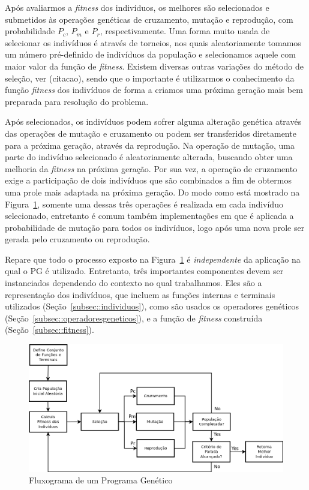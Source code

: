 Após avaliarmos a \textit{fitness} dos indivíduos, os melhores são selecionados e submetidos às operações genéticas de cruzamento, mutação e reprodução, com probabilidade $P_c$, $P_m$ e $P_r$, respectivamente.
Uma forma muito usada de selecionar os indivíduos é através de torneios, nos quais aleatoriamente tomamos um número pré-definido de indivíduos da população e selecionamos aquele com maior valor da função de \textit{fitness}. Existem diversas outras variações do método de seleção, ver (citacao), sendo que o importante é utilizarmos o conhecimento da função \textit{fitness} dos indivíduos de forma a criamos uma próxima geração mais bem preparada para resolução do problema. 

Após selecionados, os indivíduos podem sofrer alguma alteração genética através das operações de mutação e cruzamento ou podem ser transferidos diretamente para a próxima geração, através da reprodução. 
Na operação de mutação, uma parte do indivíduo selecionado é aleatoriamente alterada, buscando obter uma melhoria da \textit{fitness} na próxima geração.
Por sua vez, a operação de cruzamento exige a participação de dois indivíduos que são combinados a fim de obtermos uma prole mais adaptada na próxima geração.
Do modo como está mostrado na Figura~\ref{fig::gpwf}, somente uma dessas três operações é realizada em cada indivíduo selecionado, entretanto é comum também implementações em que é aplicada a probabilidade de mutação para todos os indivíduos, logo após uma nova prole ser gerada pelo cruzamento ou reprodução.

Repare que todo o processo exposto na Figura~\ref{fig::gpwf} é \textit{independente} da aplicação na qual o \textsc{PG} é utilizado. 
Entretanto, três importantes componentes devem ser instanciados dependendo do contexto no qual trabalhamos. 
Eles são a representação dos indivíduos, que incluem as funções internas e terminais utilizados (Seção~\ref{subsec::individuos}), 
como são usados os operadores genéticos (Seção~\ref{subsec::operadoresgeneticos}),
e a função de \textit{fitness} construída (Seção~\ref{subsec::fitness}).

\begin{figure}[ht!]
\centering
\includegraphics[width=1.0\textwidth]{figures/gpwf.png}
\caption{Fluxograma de um Programa Genético}
\label{fig::gpwf}
\end{figure}

